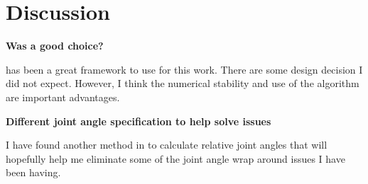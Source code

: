 
\section{Discussion}
\label{sec:Conclusion}

	\noindent \textbf{Was \bulletPhysics a good choice?}
	
	\bulletPhysics has been a great framework to use for this work. There are some design decision I did not expect. However, I think the numerical stability and use of the \Featherstone algorithm are important advantages.

	\noindent \textbf{Different joint angle specification to help solve issues}
	
	I have found another method in \bulletPhysics to calculate relative joint angles that will hopefully help me eliminate some of the joint angle wrap around issues I have been having.
	
